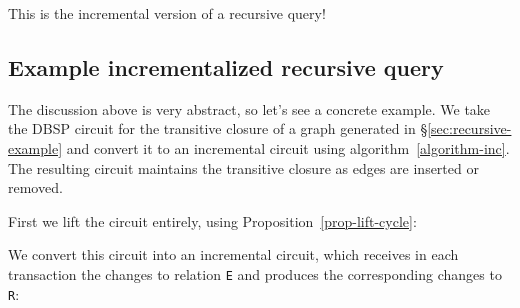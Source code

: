 \documentclass[twocolumn
]{svjour3}
\numberwithin{equation}{section}
\newcommand{\dbsp}{DBSP\xspace}
\newcommand{\code}[1]{\mbox{\texttt{#1}}}
\newcommand{\zm}{\ensuremath{z^{-1}}} %
\newcommand{\inc}[1]{{#1}^{\Delta}}
\newcommand{\distinct}{\mathit{dist}}  %
\newcommand{\secref}[1]{\S\ref{#1}}  %
\newcommand{\refsec}[1]{\secref{#1}}
\newcommand{\lift}[1]{{\uparrow}#1}
\begin{document}
\noindent This is the incremental version of a recursive query!

%
\subsection{Example incrementalized recursive query}\label{sec:recursive-incremental-example}

The discussion above is very abstract, so let's see a concrete example.
We take the \dbsp circuit for the transitive closure of a graph
generated in \refsec{sec:recursive-example} and convert it to an
incremental circuit using algorithm~\ref{algorithm-inc}.  The
resulting circuit maintains the transitive closure as edges are
inserted or removed.

First we lift the circuit entirely, using Proposition~\ref{prop-lift-cycle}:

\noindent
{}

We convert this circuit into an incremental circuit, which receives in
each transaction the changes to relation \code{E} and produces the
corresponding changes to \code{R}:
\end{document}

